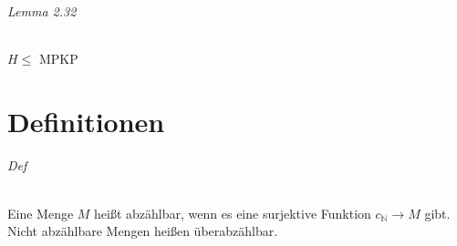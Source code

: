 \paragraph*{Lemma 2.32} $H \leq$ MPKP



\newpage
\part*{Definitionen}
\paragraph*{Def} Eine Menge $M$ heißt abzählbar, wenn es eine surjektive Funktion $c_\mathbb{N}\rightarrow M$ gibt. Nicht abzählbare Mengen heißen überabzählbar.



